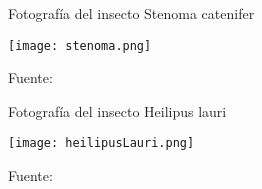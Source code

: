 \begin{figure}[h]
\centering
\caption{Fotografía del insecto Stenoma catenifer}
\texttt{[image: stenoma.png]}
\caption*{\footnotesize Fuente: \cite{diaz2017}}
\label{fig:figuraStenoma}
\end{figure}

\begin{figure}[h]
\centering
\caption{Fotografía del insecto Heilipus lauri}
\texttt{[image: heilipusLauri.png]}
\caption*{\footnotesize Fuente: \cite{palacios2011}}
\label{fig:figuraHeilipus}
\end{figure}